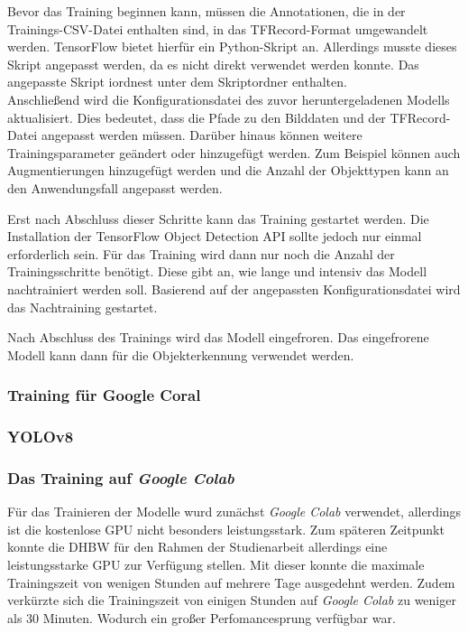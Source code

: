 Bevor das Training beginnen kann, müssen die Annotationen, die in der Trainings-CSV-Datei enthalten sind, in das TFRecord-Format umgewandelt werden. TensorFlow bietet hierfür ein Python-Skript an. Allerdings musste dieses Skript angepasst werden, da es nicht direkt verwendet werden konnte. Das angepasste Skript iordnest unter dem Skriptordner enthalten.\\
Anschließend wird die Konfigurationsdatei des zuvor heruntergeladenen Modells aktualisiert. Dies bedeutet, dass die Pfade zu den Bilddaten und der TFRecord-Datei angepasst werden müssen. Darüber hinaus können weitere Trainingsparameter geändert oder hinzugefügt werden. Zum Beispiel können auch Augmentierungen hinzugefügt werden und die Anzahl der Objekttypen kann an den Anwendungsfall angepasst werden.

Erst nach Abschluss dieser Schritte kann das Training gestartet werden. Die Installation der TensorFlow Object Detection API sollte jedoch nur einmal erforderlich sein. Für das Training wird dann nur noch die Anzahl der Trainingsschritte benötigt. Diese gibt an, wie lange und intensiv das Modell nachtrainiert werden soll. Basierend auf der angepassten Konfigurationsdatei wird das Nachtraining gestartet.

Nach Abschluss des Trainings wird das Modell eingefroren. Das eingefrorene Modell kann dann für die Objekterkennung verwendet werden.

\subsubsection{Training für Google Coral} \label{cap:coral_train}

\subsubsection{\ac{YOLO}v8} \label{cap:yolov8}

\subsubsection{Das Training auf \textit{Google Colab}}

Für das Trainieren der Modelle wurd zunächst \textit{Google Colab} verwendet, allerdings ist die kostenlose \ac{GPU} nicht besonders leistungsstark. Zum späteren Zeitpunkt konnte die DHBW für den Rahmen der Studienarbeit allerdings eine leistungsstarke \ac{GPU} zur Verfügung stellen. Mit dieser konnte die maximale Trainingszeit von wenigen Stunden auf mehrere Tage ausgedehnt werden. Zudem verkürzte sich die Trainingszeit von einigen Stunden auf \textit{Google Colab} zu weniger als 30 Minuten. Wodurch ein großer Perfomancesprung verfügbar war.

